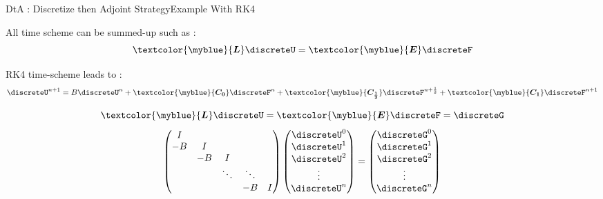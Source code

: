 \begin{frame}{DtA : Discretize then Adjoint Strategy}{Example With RK4}

  All time scheme can be summed-up such as :
  \begin{equation}
    \textcolor{\myblue}{\boldsymbol{L}}\discreteU=\textcolor{\myblue}{\boldsymbol{E}}\discreteF
  \end{equation}

  \small
      RK4 time-scheme leads to :
    \begin{equation}
      \discreteU^{n+1}=B\discreteU^n+\textcolor{\myblue}{\boldsymbol{C_0}}\discreteF^n+\textcolor{\myblue}{\boldsymbol{C_{\frac{1}{2}}}}\discreteF^{n+\frac{1}{2}}+\textcolor{\myblue}{\boldsymbol{C_1}}\discreteF^{n+1}
    \end{equation}

\begin{equation}
  \textcolor{\myblue}{\boldsymbol{L}}\discreteU=\textcolor{\myblue}{\boldsymbol{E}}\discreteF=\discreteG
\end{equation}
\begin{equation}
  \begin{pmatrix}
    I & & & & \\
    -B&I & & & \\
    & -B&I  & & \\
    & & \ddots & \ddots   & \\
    & &  & -B &I \\
  \end{pmatrix}
    \begin{pmatrix}
    \discreteU^0 \\
    \discreteU^1 \\
    \discreteU^2 \\
    \vdots \\
    \discreteU^n \\
  \end{pmatrix}=
  \begin{pmatrix}
    \discreteG^0 \\
    \discreteG^1 \\
    \discreteG^2 \\
    \vdots \\
    \discreteG^n \\
  \end{pmatrix}
  \end{equation}
\end{frame}



